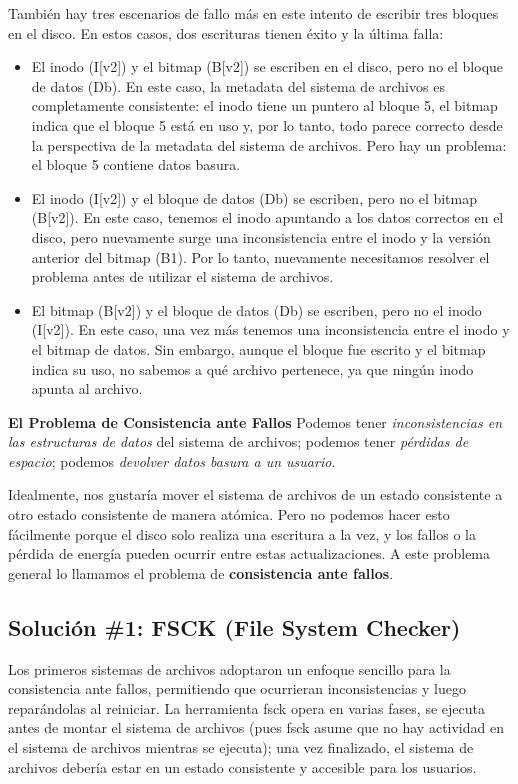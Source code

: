 \documentclass[openany]{book}
\begin{document}
También hay tres escenarios de fallo más en este intento de escribir tres bloques en el disco. En estos casos, dos escrituras tienen éxito y la última falla:

\begin{itemize}
    \item \colorbox{blue!20}{El inodo (I[v2]) y el bitmap (B[v2]) se escriben en el disco, pero no el bloque de datos (Db)}. En este caso, la metadata del sistema de archivos es completamente consistente: el inodo tiene un puntero al bloque 5, el bitmap indica que el bloque 5 está en uso y, por lo tanto, todo parece correcto desde la perspectiva de la metadata del sistema de archivos. Pero hay un problema: el bloque 5 contiene datos basura.
    \item \colorbox{blue!20}{El inodo (I[v2]) y el bloque de datos (Db) se escriben, pero no el bitmap (B[v2])}. En este caso, tenemos el inodo apuntando a los datos correctos en el disco, pero nuevamente surge una inconsistencia entre el inodo y la versión anterior del bitmap (B1). Por lo tanto, nuevamente necesitamos resolver el problema antes de utilizar el sistema de archivos.
    \item \colorbox{blue!20}{El bitmap (B[v2]) y el bloque de datos (Db) se escriben, pero no el inodo (I[v2])}. En este caso, una vez más tenemos una inconsistencia entre el inodo y el bitmap de datos. Sin embargo, aunque el bloque fue escrito y el bitmap indica su uso, no sabemos a qué archivo pertenece, ya que ningún inodo apunta al archivo.
\end{itemize}

\begin{tcolorbox}[colback=black!5!white,colframe=black!75!black]
    \textbf{El Problema de Consistencia ante Fallos}
    \tcblower
    Podemos tener \textit{inconsistencias en las estructuras de datos} del sistema de archivos; podemos tener \textit{pérdidas de espacio}; podemos \textit{devolver datos basura a un usuario}.

    Idealmente, nos gustaría mover el sistema de archivos de un estado consistente a otro estado consistente de manera atómica. Pero no podemos hacer esto fácilmente porque el disco solo realiza una escritura a la vez, y los fallos o la pérdida de energía pueden ocurrir entre estas actualizaciones. A este problema general lo llamamos el problema de \textbf{consistencia ante fallos}.
\end{tcolorbox}

\subsection{Solución \#1: FSCK (File System Checker)}
Los primeros sistemas de archivos adoptaron un enfoque sencillo para la consistencia ante fallos, permitiendo que ocurrieran inconsistencias y luego reparándolas al reiniciar. La herramienta fsck opera en varias fases, se ejecuta antes de montar el sistema de archivos (pues fsck asume que no hay actividad en el sistema de archivos mientras se ejecuta); una vez finalizado, el sistema de archivos debería estar en un estado consistente y accesible para los usuarios.
\end{document}
